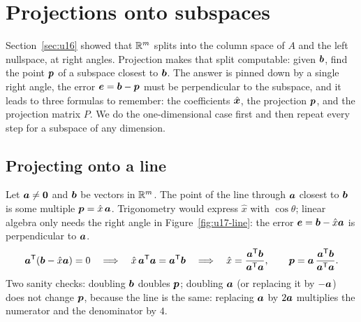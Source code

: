 \section{Projections onto subspaces}\label{sec:u17}

Section~\ref{sec:u16} showed that $\mathbb{R}^m$ splits into the column space of $A$ and the left
nullspace, at right angles. Projection makes that split computable: given $\boldsymbol{b}$, find the
point $\boldsymbol{p}$ of a subspace closest to $\boldsymbol{b}$. The answer is pinned down by a single right
angle, the error $\boldsymbol{e}=\boldsymbol{b}-\boldsymbol{p}$ must be perpendicular to the subspace, and it leads to
three formulas to remember: the coefficients $\hat{\boldsymbol{x}}$, the projection $\boldsymbol{p}$, and the
projection matrix $P$. We do the one-dimensional case first and then repeat every step for a
subspace of any dimension.

\subsection{Projecting onto a line}

Let $\boldsymbol{a}\neq\boldsymbol{0}$ and $\boldsymbol{b}$ be vectors in $\mathbb{R}^m$. The point of the line through
$\boldsymbol{a}$ closest to $\boldsymbol{b}$ is some multiple $\boldsymbol{p}=\hat{x}\,\boldsymbol{a}$. Trigonometry would
express $\hat{x}$ with $\cos\theta$; linear algebra only needs the right angle in
Figure~\ref{fig:u17-line}: the error $\boldsymbol{e}=\boldsymbol{b}-\hat{x}\boldsymbol{a}$ is perpendicular to
$\boldsymbol{a}$.
\[
  \boldsymbol{a}^{\mathsf{T}}(\boldsymbol{b}-\hat{x}\boldsymbol{a})=0
  \quad\Longrightarrow\quad
  \hat{x}\,\boldsymbol{a}^{\mathsf{T}}\boldsymbol{a}=\boldsymbol{a}^{\mathsf{T}}\boldsymbol{b}
  \quad\Longrightarrow\quad
  \hat{x}=\frac{\boldsymbol{a}^{\mathsf{T}}\boldsymbol{b}}{\boldsymbol{a}^{\mathsf{T}}\boldsymbol{a}},\qquad
  \boldsymbol{p}=\boldsymbol{a}\,\frac{\boldsymbol{a}^{\mathsf{T}}\boldsymbol{b}}{\boldsymbol{a}^{\mathsf{T}}\boldsymbol{a}} .
\]
Two sanity checks: doubling $\boldsymbol{b}$ doubles $\boldsymbol{p}$; doubling $\boldsymbol{a}$ (or replacing it by
$-\boldsymbol{a}$) does not change $\boldsymbol{p}$, because the line is the same: replacing $\boldsymbol{a}$ by $2\boldsymbol{a}$ multiplies the
numerator and the denominator by $4$.

